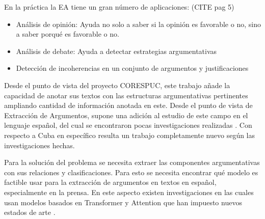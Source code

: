 En la práctica la EA tiene un gran número de aplicaciones: (CITE \cite{janier2019argument} pag 5)
\begin{itemize}
    \item Análisis de opinión: Ayuda no solo a saber si la opinión es favorable o no, sino a saber
    porqué es favorable o no.
    \item Análisis de debate: Ayuda a detectar estrategias argumentativas
    \item Detección de incoherencias en un conjunto de argumentos y justificaciones
\end{itemize}


Desde el punto de vista del proyecto CORESPUC, este trabajo añade la capacidad de anotar
sus textos con las estructuras argumentativas pertinentes ampliando cantidad de
información anotada en este. Desde el punto de vista de Extracción de Argumentos, supone una
adición al estudio de este campo en el lenguaje español, del cual se encontraron pocas
investigaciones realizadas \cite{esteve2020mineria}. Con respecto a Cuba en específico
resulta un trabajo completamente nuevo según las investigaciones hechas.


Para la solución del problema se necesita extraer las componentes argumentativas con sus relaciones
y clasificaciones. Para esto se necesita encontrar qué modelo es factible usar para la extracción de
argumentos en textos en español, especialmente en la prensa. En este aspecto existen investigaciones
en las cuales usan modelos basados en Transformer y Attention que han impuesto nuevos estados de arte
\cite{mayer2020transformer} \cite{galassi2018argumentative}.



